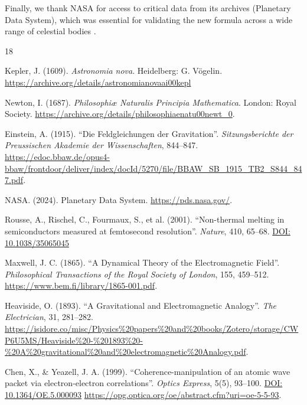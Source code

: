 \documentclass[11pt, a4paper]{article}
\newcommand{\doi}[1]{\href{https://doi.org/#1}{DOI: #1}}
\begin{document}
Finally, we thank NASA for access to critical data from its archives (Planetary Data System), which was essential for validating the new formula across a wide range of celestial bodies \cite{nasa2024}.

\begin{thebibliography}{18}

  Kepler, J. (1609). \textit{Astronomia nova}. Heidelberg: G. Vögelin.
  \url{https://archive.org/details/astronomianovaai00kepl}

  Newton, I. (1687). \textit{Philosophiæ Naturalis Principia Mathematica}. London: Royal Society. 
  \url{https://archive.org/details/philosophiaenatu00newt_0}.

  Einstein, A. (1915). ``Die Feldgleichungen der Gravitation''. \textit{Sitzungsberichte der Preussischen Akademie der Wissenschaften}, 844–847. 
  \url{https://edoc.bbaw.de/opus4-bbaw/frontdoor/deliver/index/docId/5270/file/BBAW_SB_1915_TB2_S844_847.pdf}.

  NASA. (2024). Planetary Data System. \url{https://pds.nasa.gov/}.

  Rousse, A., Rischel, C., Fourmaux, S., et al. (2001). ``Non-thermal melting in semiconductors measured at femtosecond resolution''. \textit{Nature}, 410, 65--68. 
  \doi{10.1038/35065045}

  Maxwell, J. C. (1865). ``A Dynamical Theory of the Electromagnetic Field''. \textit{Philosophical Transactions of the Royal Society of London}, 155, 459–512. 
  \url{https://www.bem.fi/library/1865-001.pdf}.

  Heaviside, O. (1893). ``A Gravitational and Electromagnetic Analogy''. \textit{The Electrician}, 31, 281–282. 
  \url{https://isidore.co/misc/Physics%20papers%20and%20books/Zotero/storage/CWP6U5MS/Heaviside%20-%201893%20-%20A%20gravitational%20and%20electromagnetic%20Analogy.pdf}.

  Chen, X., \& Yeazell, J. A. (1999). ``Coherence-manipulation of an atomic wave packet via electron-electron correlations''. \textit{Optics Express}, 5(5), 93--100. 
  \doi{10.1364/OE.5.000093} \url{https://opg.optica.org/oe/abstract.cfm?uri=oe-5-5-93}.


\end{thebibliography}
\end{document}
